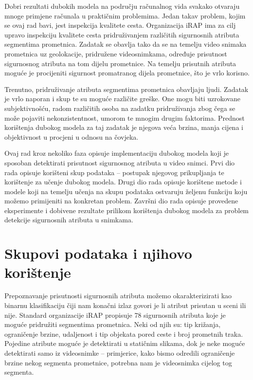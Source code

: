 \documentclass[times, utf8, diplomski, numeric]{fer}
\begin{document}
Dobri rezultati dubokih modela na području računalnog vida svakako otvaraju mnoge primjene računala u praktičnim problemima. 
Jedan takav problem, kojim se ovaj rad bavi, jest inspekcija kvalitete cesta. 
Organizacija iRAP  ima za cilj upravo inspekciju kvalitete cesta pridruživanjem različitih sigurnosnih atributa segmentima prometnica.
Zadatak se obavlja tako da se na temelju video snimaka prometnica uz geolokacije, pridružene videosnimkama, određuje prisutnost sigurnosnog atributa na tom dijelu prometnice.
Na temelju prisutnih atributa moguće je procijeniti sigurnost promatranog dijela prometnice, što je vrlo korisno.

Trenutno, pridruživanje atributa segmentima prometnica obavljaju ljudi. 
Zadatak je vrlo naporan i skup te su moguće različite greške. One mogu biti uzrokovane subjektivnošću, radom različitih osoba na zadatku pridruživanja zbog čega se može pojaviti nekonzistentnost, umorom te mnogim drugim faktorima.
Prednost korištenja dubokog modela za taj zadatak je njegova veća brzina, manja cijena i objektivnost u procjeni u odnosu na čovjeka.

Ovaj rad kroz nekoliko faza opisuje implementaciju dubokog modela koji je sposoban detektirati prisutnost sigurnosnog atributa u video snimci.
Prvi dio rada opisuje korišteni skup podataka -- postupak njegovog prikupljanja te korištenje za učenje dubokog modela.
Drugi dio rada opisuje korištene metode i modele koji na temelju učenja na skupu podataka ostvaruju željenu funkciju koju možemo primijeniti na konkretan problem.
Završni dio rada opisuje provedene eksperimente i dobivene rezultate prilikom korištenja dubokog modela za problem detekcije sigurnosnih atributa u snimkama.


\chapter{Skupovi podataka i njihovo korištenje} \label{chapter:skupovi_podataka}
 
Prepoznavanje prisutnosti sigurnosnih atributa možemo okarakterizirati kao binarnu klasifikaciju čiji nam konačni izlaz govori je li atribut prisutan u sceni ili nije.
Standard organizacije iRAP propisuje 78 sigurnosnih atributa \citep{man:ftts_irap_attributes} koje je moguće pridružiti segmentima prometnica.
Neki od njih su: tip križanja, ograničenje brzine, udaljenost i tip objekata pored ceste i broj prometnih traka.
Pojedine atribute moguće je detektirati u statičnim slikama, dok je neke moguće detektirati samo iz videosnimke -- primjerice, kako bismo odredili ograničenje brzine nekog segmenta prometnice, potrebna nam je videosnimka cijelog tog segmenta.
\end{document}
